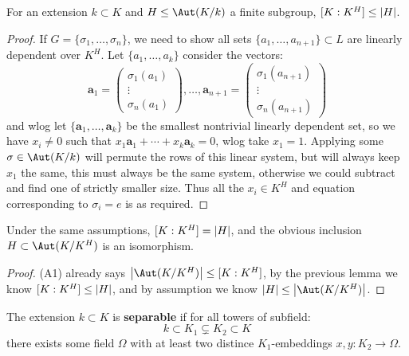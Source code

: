 \documentclass{article}
\begin{document}
\begin{lemma}
    For an extension $k\subset K$ and $H\leq \Aut(K/k)$ a finite subgroup, $[K:K^H]\leq \left| H \right|$.
    \begin{proof}
        If $G = \{\sigma_1,\ldots,\sigma_n\}$, we need to show all sets $\{a_1,\ldots,a_{n+1}\}\subset L$ are linearly dependent over $K^H$. Let $\{a_1,\ldots,a_k\}$ consider the vectors: \[
        \mathbf{a}_1=\begin{pmatrix}
            \sigma_1(a_1) \\
            \vdots \\
            \sigma_n(a_1)
        \end{pmatrix},
        \ldots,
        \mathbf{a}_{n+1}=\begin{pmatrix}
            \sigma_1(a_{n+1}) \\
            \vdots \\
            \sigma_n(a_{n+1})
        \end{pmatrix}
        \] and wlog let $\{\mathbf{a}_1,\ldots,\mathbf{a}_k\}$ be the smallest nontrivial linearly dependent set, so we have $x_i\neq 0$ such that $x_1\mathbf{a}_1 + \cdots + x_k\mathbf{a}_k = 0$, wlog take $x_1=1$. Applying some $\sigma\in \Aut(K/k)$ will permute the rows of this linear system, but will always keep $x_1$ the same, this must always be the same system, otherwise we could subtract and find one of strictly smaller size. Thus all the $x_i\in K^H$ and equation corresponding to $\sigma_i=e$ is as required.
    \end{proof}
\end{lemma}

\begin{corollary}[A5]
    Under the same assumptions, $[K:K^H]=\left| H \right|$, and the obvious inclusion $H\subset\Aut(K/K^H)$ is an isomorphism.\begin{proof}
        (A1) already says $\abs{\Aut(K/K^H)}\leq [K:K^H]$, by the previous lemma we know $[K:K^H]\leq \left| H \right|$, and by assumption we know $\abs{H}\leq \abs{\Aut(K/K^H)}$.
    \end{proof}
\end{corollary}

\begin{definition}
    The extension $k\subset K$ is \textbf{separable} if for all towers of subfield: \[
    k \subset K_1 \subsetneq K_2 \subset K
    \] there exists some field $\Omega$ with at least two distince $K_1$-embeddings $x,y:K_2\rightarrow\Omega$.
\end{definition}
\end{document}
